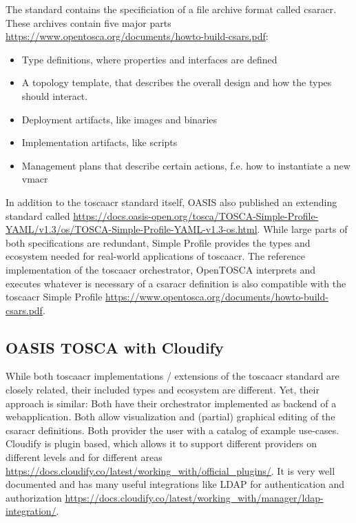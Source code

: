 \newline
The standard contains the specificiation of a file archive format called \gls{csaracr}. These archives contain five major parts \url{https://www.opentosca.org/documents/howto-build-csars.pdf}:
\begin{itemize}
  \item Type definitions, where properties and interfaces are defined
  \item A topology template, that describes the overall design and how the types should interact.
  \item Deployment artifacts, like images and binaries
  \item Implementation artifacts, like scripts
  \item Management plans that describe certain actions, f.e. how to instantiate a new \gls{vmacr}
\end{itemize}
In addition to the \gls{toscaacr} standard itself, OASIS also published an extending standard called  \url{https://docs.oasis-open.org/tosca/TOSCA-Simple-Profile-YAML/v1.3/os/TOSCA-Simple-Profile-YAML-v1.3-os.html}. While large parts of both specifications are redundant, Simple Profile provides the types and ecosystem needed for real-world applications of \gls{toscaacr}. The reference implementation of the \gls{toscaacr} orchestrator, OpenTOSCA interprets and executes whatever is necessary of a \gls{csaracr} definition is also compatible with the \gls{toscaacr} Simple Profile \url{https://www.opentosca.org/documents/howto-build-csars.pdf}.


\subsection{OASIS TOSCA with Cloudify}
While both \gls{toscaacr} implementations / extensions of the \gls{toscaacr} standard are closely related, their included types and ecosystem are different. Yet, their approach is similar: Both have their orchestrator implemented as backend of a webapplication. Both allow visualization and (partial) graphical editing of the \gls{csaracr} definitions. Both provider the user with a catalog of example use-cases.
\newline
Cloudify is plugin based, which allows it to support different providers on different levels and for different areas \url{https://docs.cloudify.co/latest/working_with/official_plugins/}. It is very well documented and has many useful integrations like LDAP for authentication and authorization \url{https://docs.cloudify.co/latest/working_with/manager/ldap-integration/}.

